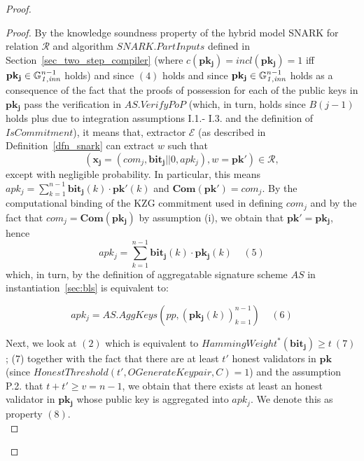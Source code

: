 \begin{proof}
\begin{proof}
\noindent By the knowledge soundness property of the hybrid model SNARK for relation $\mathcal{R}$ and 
algorithm $\mathit{SNARK.PartInputs}$ defined in Section~\ref{sec_two_step_compiler}  
(where $c(\mathbf{pk_j}) = \mathit{incl}(\mathbf{pk_j}) =1$ 
iff $\mathbf{pk_j} \in \mathbb{G}_{\mathit{1,inn}}^{n-1}$ holds) and since $(4)$ holds and since $\mathbf{pk_j} \in \mathbb{G}_{\mathit{1,inn}}^{n-1}$ holds 
as a consequence of the fact that the proofs of possession for each of the public
keys in $\mathbf{pk_j}$ pass the verification in $\mathit{AS.VerifyPoP}$ (which, in turn, holds since 
$B(j-1)$ holds plus due to integration assumptions I.1.- I.3. and the definition of $\mathit{IsCommitment}$), 
it means that, extractor $\mathcal{E}$ (as described in Definition~\ref{dfn_snark} can extract 
$w$ such that $$(\mathbf{x_j} = (\mathit{com_j},\mathbf{bit_j}||0,\mathit{apk_j}), w = \mathbf{pk'}) \in \mathcal{R},$$ 
except with negligible probability. In particular, this means $\mathit{apk_j} = \sum_{k=1}^{n-1} \mathbf{bit_j}(k) \cdot \mathbf{pk'}(k)$ and 
$\mathbf{Com}(\mathbf{pk'}) = \mathit{com_j}$. By the computational binding of the KZG commitment used in defining $\mathit{com_j}$ 
and by the fact that  $\mathit{com_j} = \mathbf{Com}(\mathbf{pk_j})$ by assumption (i), we obtain that $\mathbf{pk'} = \mathbf{pk_j}$, 
hence
$$\mathit{apk_j} = \sum_{k=1}^{n-1} \mathbf{bit_j}(k) \cdot \mathbf{pk_j}(k) \ \ \ \ \ (5)$$ 
which, in turn, by the definition of aggregatable signature scheme $\mathit{AS}$ in instantiation~\ref{sec:bls} is equivalent to: 

$$\mathit{apk_j} = \mathit{AS.AggKeys}(\mathit{pp}, (\mathbf{pk_j}(k))_{k=1}^{n-1}) \ \ \ \ \ (6)$$ 

\noindent Next, we look at $(2)$ which is equivalent to $\mathit{HammingWeight^*}(\mathbf{bit_j}) \geq t \ (7)$; (7)  
together with the fact that there are at least $t'$ honest validators in 
$\mathbf{pk}$ (since $\mathit{HonestThreshold}(t', \mathit{OGenerateKeypair}, C) = 1$) and the assumption P.2. that 
$t+t' \geq v=n-1$, we obtain that there exists at least an honest validator in $\mathbf{pk_j}$ 
whose public key is aggregated into $\mathit{apk_j}$. We denote this as property $(8)$. \\


\end{proof}
\end{proof}
